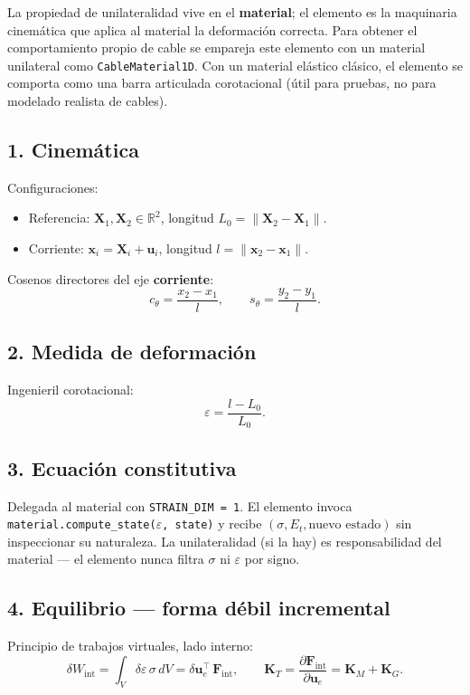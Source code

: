 \documentclass[11pt,letterpaper,oneside]{report}
\begin{document}
La propiedad de unilateralidad vive en el \textbf{material}; el elemento es la maquinaria cinemática que aplica al material la deformación correcta. Para obtener el comportamiento propio de cable se empareja este elemento con un material unilateral como \texttt{CableMaterial1D}. Con un material elástico clásico, el elemento se comporta como una barra articulada corotacional (útil para pruebas, no para modelado realista de cables).

\subsection{1. Cinemática}
Configuraciones:
\begin{itemize}
  \item Referencia: $\mathbf X_1, \mathbf X_2 \in \mathbb{R}^2$, longitud $L_0 = \|\mathbf X_2 - \mathbf X_1\|$.
  \item Corriente: $\mathbf x_i = \mathbf X_i + \mathbf u_i$, longitud $l = \|\mathbf x_2 - \mathbf x_1\|$.
\end{itemize}

Cosenos directores del eje \textbf{corriente}:
\[
c_\theta = \frac{x_2 - x_1}{l}, \qquad s_\theta = \frac{y_2 - y_1}{l}.
\]

\subsection{2. Medida de deformación}
Ingenieril corotacional:
\[
\varepsilon = \frac{l - L_0}{L_0}.
\]

\subsection{3. Ecuación constitutiva}
Delegada al material con \texttt{STRAIN\_DIM = 1}. El elemento invoca \texttt{material.compute\_state(\ensuremath{\varepsilon}, state)} y recibe $(\sigma, E_t, \text{nuevo estado})$ sin inspeccionar su naturaleza. La unilateralidad (si la hay) es responsabilidad del material --- el elemento nunca filtra $\sigma$ ni $\varepsilon$ por signo.

\subsection{4. Equilibrio --- forma débil incremental}
Principio de trabajos virtuales, lado interno:
\[
\delta W_{\text{int}} = \int_V \delta\varepsilon\,\sigma\,dV = \delta\mathbf u_e^\top\,\mathbf F_{\text{int}}, \qquad \mathbf K_T = \frac{\partial\mathbf F_{\text{int}}}{\partial\mathbf u_e} = \mathbf K_M + \mathbf K_G.
\]
\end{document}
